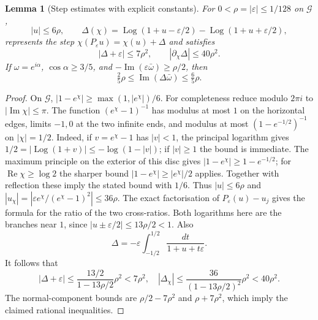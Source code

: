 \documentclass[11pt]{article}
\newtheorem{lemma}[theorem]{Lemma}
\newcommand{\re}{\operatorname{Re}}
\newcommand{\im}{\operatorname{Im}}
\newcommand{\Log}{\operatorname{Log}}
\begin{document}
\begin{lemma}[Step estimates with explicit constants]\label{lem:step}
For $0<\rho=|\varepsilon|\le1/128$ on $\mathcal G$,
\[
 |u|\le6\rho,\qquad
 \Delta(\chi)=\Log(1+u-\varepsilon/2)-\Log(1+u+\varepsilon/2),
\]
represents the step $\chi(P_\varepsilon u)=\chi(u)+\Delta$ and satisfies
\[
 |\Delta+\varepsilon|\le7\rho^2,\qquad
 |\partial_\chi\Delta|\le40\rho^2.
\]
If $\omega=e^{i\alpha}$, $\cos\alpha\ge3/5$, and
$-\im(\varepsilon\bar\omega)\ge\rho/2$, then
\[
 \tfrac25\rho\le\im(\Delta\bar\omega)\le\tfrac65\rho.
\]
\end{lemma}
\begin{proof}
On $\mathcal G$, $|1-e^\chi|\ge\max(1,|e^\chi|)/6$.
For completeness reduce modulo $2\pi i$ to $|\im\chi|\le\pi$.
The function $(e^\chi-1)^{-1}$ has modulus at most $1$ on the horizontal
edges, limits $-1,0$ at the two infinite ends, and modulus at most
$(1-e^{-1/2})^{-1}$ on $|\chi|=1/2$. Indeed, if
$v=e^\chi-1$ has $|v|<1$, the principal logarithm gives
$1/2=|\Log(1+v)|\le-\log(1-|v|)$; if $|v|\ge1$ the bound is immediate.
The maximum principle on the exterior of this disc gives
$|1-e^\chi|\ge1-e^{-1/2}$; for $\re\chi\ge\log2$ the sharper bound
$|1-e^\chi|\ge|e^\chi|/2$ applies. Together with reflection these imply the
stated bound with $1/6$. Thus $|u|\le6\rho$ and
$|u_\chi|=|\varepsilon e^\chi/(e^\chi-1)^2|\le36\rho$.
The exact factorisation of $P_\varepsilon(u)-u_j$ gives the formula for
the ratio of the two cross-ratios. Both logarithms here are the branches
near $1$, since $|u\pm\varepsilon/2|\le13\rho/2<1$.
Also
\[
 \Delta=-\varepsilon\int_{-1/2}^{1/2}\frac{dt}{1+u+t\varepsilon}.
\]
It follows that
\[
 |\Delta+\varepsilon|\le
 \frac{13/2}{1-13\rho/2}\rho^2<7\rho^2,\quad
 |\Delta_\chi|\le\frac{36}{(1-13\rho/2)^2}\rho^2<40\rho^2.
\]
The normal-component bounds are $\rho/2-7\rho^2$ and $\rho+7\rho^2$,
which imply the claimed rational inequalities.
\end{proof}
\end{document}
